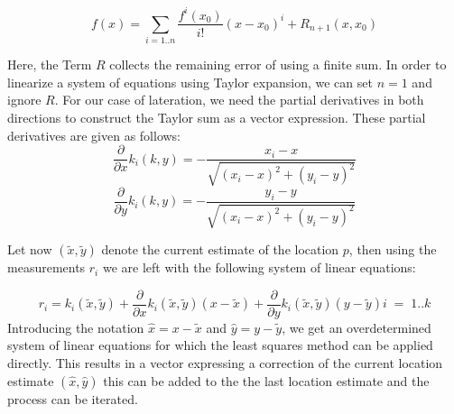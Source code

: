 \[
  f(x) = \sum_{i=1..n}{ \frac{f^{i}(x_0)}{i!}(x-x_0)^i + R_{n+1}(x,x_0)}
\]

Here, the Term \(R\) collects the remaining error of using a finite sum.
In order to linearize a system of equations using Taylor expansion, we
can set \(n=1\) and ignore \(R\). For our case of lateration, we need
the partial derivatives in both directions to construct the Taylor sum
as a vector expression. These partial derivatives are given as follows:
\[
  \frac{\partial}{\partial x} k_i(k,y) = - \frac{x_i-x}{\sqrt{(x_i-x)^2+ (y_i -y)^2}}
\]
\[\frac{\partial}{\partial y} k_i(k,y) = - \frac{y_i-y}{\sqrt{(x_i-x)^2+ (y_i -y)^2}}\]

Let now \((\tilde{x}, \tilde{y})\) denote the current estimate of the
location \(p\), then using the measurements \(r_i\) we are left with the
following system of linear equations:

\begin{equation}\label{eq:1}
  r_i = k_i(\tilde{x}, \tilde{y}) + \frac{\partial}{\partial x} k_i(\tilde{x}, \tilde{y})(x - \tilde{x}) + \frac{\partial}{\partial y} k_i(\tilde{x}, \tilde{y})(y - \tilde{y}) i \;= \;1..k
\end{equation}
Introducing the notation \(\hat{x}=x-\tilde{x}\) and
\(\hat{y}=y-\tilde{y}\), we get an overdetermined system of linear
equations for which the least squares method can be applied directly.
This results in a vector expressing a correction of the current location
estimate \((\hat{x}, \hat{y})\) this can be added to the the last
location estimate and the process can be iterated.

